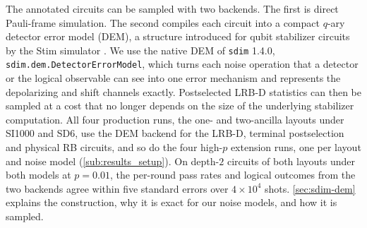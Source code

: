 The annotated circuits can be sampled with two backends. The first is direct Pauli-frame simulation. The second compiles each circuit into a compact $q$-ary detector error model (DEM), a structure introduced for qubit stabilizer circuits by the Stim simulator \cite{Gidney2021Stim}. We use the native DEM of \texttt{sdim} 1.4.0, \texttt{sdim.dem.DetectorErrorModel}, which turns each noise operation that a detector or the logical observable can see into one error mechanism and represents the depolarizing and shift channels exactly. Postselected LRB-D statistics can then be sampled at a cost that no longer depends on the size of the underlying stabilizer computation. All four production runs, the one- and two-ancilla layouts under SI1000 and SD6, use the DEM backend for the LRB-D, terminal postselection and physical RB circuits, and so do the four high-$p$ extension runs, one per layout and noise model (\autoref{sub:results_setup}). %
On depth-$2$ circuits of both layouts under both models at $p = 0.01$, the per-round pass rates and logical outcomes from the two backends agree within five standard errors over $4 \times 10^4$ shots. \autoref{sec:sdim-dem} explains the construction, why it is exact for our noise models, and how it is sampled.
